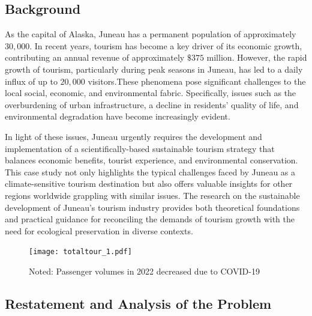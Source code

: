 \documentclass{mcmthesis}
\begin{document}
\subsection{Background}
As the capital of Alaska, Juneau has a permanent population of approximately $30,000$. In recent years, 
tourism has become a key driver of its economic growth, contributing an annual revenue of approximately 
$\$375$ million. However, the rapid growth of tourism, particularly during peak seasons in Juneau, has led to 
a daily influx of up to $20,000$ visitors.These phenomena pose significant challenges to the local 
social, economic, and environmental fabric. Specifically, issues such as the overburdening of urban 
infrastructure, a decline in residents' quality of life, and environmental degradation have become 
increasingly evident.\par
In light of these issues, Juneau urgently requires the development and implementation of a 
scientifically-based sustainable tourism strategy that balances economic benefits, tourist 
experience, and environmental conservation. This case study not only highlights the typical 
challenges faced by Juneau as a climate-sensitive tourism destination but also offers valuable 
insights for other regions worldwide grappling with similar issues. The research on the sustainable 
development of Juneau's tourism industry provides both theoretical foundations and practical 
guidance for reconciling the demands of tourism growth with the need for ecological preservation in 
diverse contexts.

\begin{figure}[h] 
  \centering
  \texttt{[image: totaltour\_1.pdf]}
  \caption*{Noted: Passenger volumes in 2022 decreased due to COVID-19}\label{fig1}
  \end{figure}

  \subsection{Restatement and Analysis of the Problem}
\end{document}
